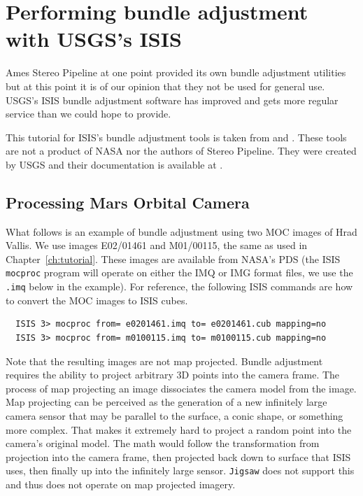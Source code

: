\section{Performing bundle adjustment with USGS's ISIS}

Ames Stereo Pipeline at one point provided its own bundle adjustment
utilities but at this point it is of our opinion that they not be used
for general use. USGS's \ac{ISIS} bundle adjustment software has
improved and gets more regular service than we could hope to provide.

This tutorial for ISIS's bundle adjustment tools is taken from
\cite{lunokhod:controlnetwork} and \cite{lunokhod:gcp}. These tools
are not a product of NASA nor the authors of Stereo Pipeline. They
were created by USGS and their documentation is available at
\cite{isis:documentation}.

\subsection{Processing Mars Orbital Camera}
\label{sec:ba_example}

What follows is an example of bundle adjustment using two \ac{MOC}
images of Hrad Vallis. We use images E02/01461 and M01/00115, the same
as used in Chapter~\ref{ch:tutorial}. These images are available from
NASA's \ac{PDS} (the \ac{ISIS} \texttt{mocproc} program will operate
on either the IMQ or IMG format files, we use the \texttt{.imq} below
in the example).  For reference, the following \ac{ISIS} commands are
how to convert the \ac{MOC} images to \ac{ISIS} cubes.

\begin{verbatim}
  ISIS 3> mocproc from= e0201461.imq to= e0201461.cub mapping=no
  ISIS 3> mocproc from= m0100115.imq to= m0100115.cub mapping=no
\end{verbatim}

Note that the resulting images are not map projected. Bundle
adjustment requires the ability to project arbitrary 3D points into
the camera frame. The process of map projecting an image dissociates
the camera model from the image. Map projecting can be perceived as
the generation of a new infinitely large camera sensor that may be
parallel to the surface, a conic shape, or something more
complex. That makes it extremely hard to project a random point into
the camera's original model. The math would follow the transformation
from projection into the camera frame, then projected back down to
surface that ISIS uses, then finally up into the infinitely large
sensor. \texttt{Jigsaw} does not support this and thus does not
operate on map projected imagery.

